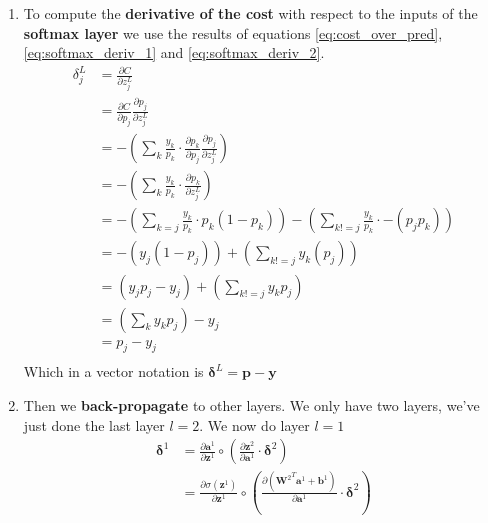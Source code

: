 			\begin{enumerate}
				\item To compute the \textbf{derivative of the cost} with respect to the inputs of the \textbf{softmax layer} we use the results of equations \ref{eq:cost_over_pred}, \ref{eq:softmax_deriv_1} and \ref{eq:softmax_deriv_2}.
					\begin{equation}
						\begin{split}
							\delta^L_j
							&= \frac{\partial C}{\partial z^L_j } \\
							&= \frac{\partial C}{\partial p_j} \frac{\partial p_j}{\partial z^L_j } \\
							&= -\left(\sum_k \frac{y_k}{p_k} \cdot \frac{\partial p_k}{\partial p_j } \frac{\partial p_j}{\partial z^L_j } \right) \\
							&= -\left(\sum_k \frac{y_k}{p_k} \cdot \frac{\partial p_k}{\partial z^L_j } \right) \\
							&= -\left(\sum_{k=j} \frac{y_k}{p_k} \cdot p_k(1 - p_k) \right) - \left(\sum_{k!=j} \frac{y_k}{p_k} \cdot -(p_j p_k) \right) \\
							&= -\left(y_j  (1 - p_j) \right) + \left(\sum_{k!=j} y_k(p_j) \right) \\
							&=  \left(y_j p_j  - y_j\right)  + \left(\sum_{k!=j} y_k p_j  \right) \\
							&=  \left(\sum_{k} y_k p_j  \right) - y_j \\
							&=  p_j - y_j \\
						\end{split}
					\end{equation}
					Which in a vector notation is $\boldsymbol{\delta}^L = \boldsymbol{p} - \boldsymbol{y}$
				\item Then we \textbf{back-propagate} to other layers. We only have two layers, we've just done the last layer $l=2$. We now do layer $l=1$
					\begin{equation}
						\begin{split}
							\boldsymbol{\delta}^{1}
							&= \frac{\partial \boldsymbol{a}^1 }		{\partial \boldsymbol{z}^1 } 		\circ
							\left( \frac{\partial \boldsymbol{z}^2 }	{\partial \boldsymbol{a}^1 } \cdot \boldsymbol{\delta}^2 \right) \\
							&= \frac{\partial \sigma(\boldsymbol{z}^1)}	{\partial \boldsymbol{z}^1}\circ
							\left( \frac{\partial ({\boldsymbol{W}^2}^T \boldsymbol{a}^1 + \boldsymbol{b}^1 )}{\partial \boldsymbol{a}^1} \cdot \boldsymbol{\delta}^2 \right)\\

\end{split}
\end{equation}
\end{enumerate}
